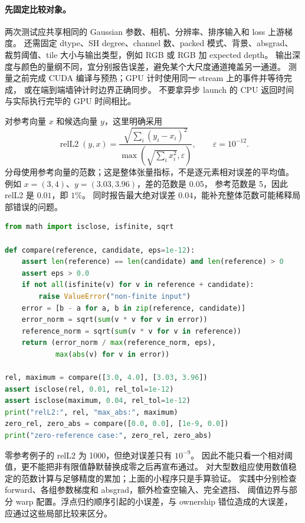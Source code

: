 \paragraph{先固定比较对象。}
两次测试应共享相同的 Gaussian 参数、相机、分辨率、排序输入和 loss 上游梯度。
还需固定 dtype、SH degree、channel 数、packed 模式、背景、absgrad、
裁剪阈值、tile 大小与输出类型，例如 RGB 或 RGB 加 expected depth。
输出深度与颜色的量纲不同，宜分别报告误差，避免某个大尺度通道掩盖另一通道。
测量之前完成 CUDA 编译与预热；GPU 计时使用同一 stream 上的事件并等待完成，
或在端到端墙钟计时边界正确同步。
不要拿异步 launch 的 CPU 返回时间与实际执行完毕的 GPU 时间相比。

对参考向量 \(x\) 和候选向量 \(y\)，这里明确采用
\[
 \operatorname{relL2}(y,x)=
 \frac{\sqrt{\sum_i(y_i-x_i)^2}}
 {\max\!\left(\sqrt{\sum_i x_i^2},\varepsilon\right)},
 \qquad \varepsilon=10^{-12}.
\]
分母使用参考向量的范数；这是整体张量指标，不是逐元素相对误差的平均值。
例如 \(x=(3,4)\)、\(y=(3.03,3.96)\)，差的范数是 0.05，
参考范数是 5，因此 relL2 是 \(0.01\)，即 \(1\%\)。
同时报告最大绝对误差 \(0.04\)，能补充整体范数可能稀释局部错误的问题。

\begin{lstlisting}[language=Python]
from math import isclose, isfinite, sqrt

def compare(reference, candidate, eps=1e-12):
    assert len(reference) == len(candidate) and len(reference) > 0
    assert eps > 0.0
    if not all(isfinite(v) for v in reference + candidate):
        raise ValueError("non-finite input")
    error = [b - a for a, b in zip(reference, candidate)]
    error_norm = sqrt(sum(v * v for v in error))
    reference_norm = sqrt(sum(v * v for v in reference))
    return (error_norm / max(reference_norm, eps),
            max(abs(v) for v in error))

rel, maximum = compare([3.0, 4.0], [3.03, 3.96])
assert isclose(rel, 0.01, rel_tol=1e-12)
assert isclose(maximum, 0.04, rel_tol=1e-12)
print("relL2:", rel, "max_abs:", maximum)
zero_rel, zero_abs = compare([0.0, 0.0], [1e-9, 0.0])
print("zero-reference case:", zero_rel, zero_abs)
\end{lstlisting}

零参考例子的 relL2 为 1000，但绝对误差只有 \(10^{-9}\)。
因此不能只看一个相对阈值，更不能把非有限值静默替换成零之后再宣布通过。
对大型数组应使用数值稳定的范数计算与足够精度的累加；上面的小程序只是手算验证。
实践中分别检查 forward、各组参数梯度和 absgrad，额外检查空输入、完全遮挡、
阈值边界与部分 warp 配置。浮点归约顺序引起的小误差，与 ownership 错位造成的大误差，
应通过这些局部比较来区分。

